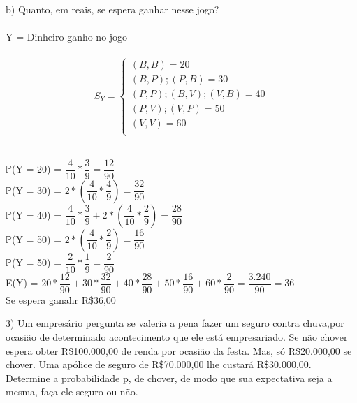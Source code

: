 \documentclass[12pt,a4paper]{article}
\begin{document}
	\vspace{1cm}
	b) Quanto, em reais, se espera ganhar nesse jogo?\\
	\vspace{1cm}\\
	Y = Dinheiro ganho no jogo\\
	\vspace{1cm}\\
	\[
	S_{Y} =
	\begin{cases}
	(B, B) = 20\\
	(B, P); (P, B) = 30\\
	(P, P); (B, V); (V, B) = 40\\
	(P, V); (V,P) = 50\\
	(V, V) =60\\
	\end{cases}
	\]
	\vspace{1cm}\\
	\begin{center}
		$\mathbb{P}$(Y = 20) = $\dfrac{4}{10} * \dfrac{3}{9} = \dfrac{12}{90}$
		\vspace{1cm}\\
		$\mathbb{P}$(Y = 30) = $2 * \left(\dfrac{4}{10} * \dfrac{4}{9}
		\right) = \dfrac{32}{90}$
		\vspace{1cm}\\
		$\mathbb{P}$(Y = 40) = $\dfrac{4}{10} * \dfrac{3}{9} + 2 * \left(\dfrac{4}{10} * \dfrac{2}{9}
		\right) = \dfrac{28}{90}$
		\vspace{1cm}\\
		$\mathbb{P}$(Y = 50) = $2 * \left(\dfrac{4}{10} * \dfrac{2}{9}
		\right) = \dfrac{16}{90}$
		\vspace{1cm}\\
		$\mathbb{P}$(Y = 50) = $\dfrac{2}{10} * \dfrac{1}{9} = \dfrac{2}{90}$
		\vspace{1cm}\\
		E(Y) = $20 * \dfrac{12}{90} + 30 * \dfrac{32}{90} + 40 * \dfrac{28}{90} + 50 * \dfrac{16}{90} + 60 * \dfrac{2}{90} = \dfrac{3.240}{90} =36$
		\vspace{1cm}\\
		Se espera ganahr R\$36,00
	\end{center}
	\vspace{1cm}
	3) Um empresário pergunta se valeria a pena fazer um seguro contra chuva,por ocasião de determinado acontecimento que ele está empresariado. Se não chover espera obter R\$100.000,00 de renda por ocasião da festa. Mas, só R\$20.000,00 se chover. Uma apólice de seguro de R\$70.000,00 lhe custará R\$30.000,00. Determine a probabilidade p, de chover, de modo que sua expectativa seja a mesma, faça ele seguro ou não.\\
\end{document}
